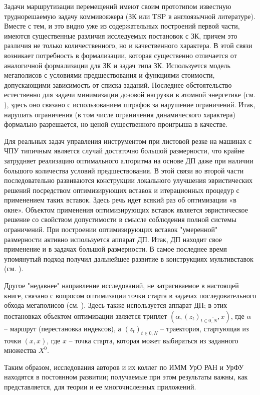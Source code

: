 \documentclass[12pt,twoside]{report}
\begin{document}
{{Задачи маршрутизации перемещений имеют своим прототипом известную труднорешаемую задачу коммивояжера (ЗК или TSP в англоязычной литературе). Вместе с тем, и это видно уже из содержательных построений первой части, имеются существенные различия исследуемых постановок с ЗК, причем это различия не только количественного, но и качественного характера. В этой связи возникает потребность в формализации, которая существенно отличается от аналогичной формализации для ЗК и задач типа ЗК. Используется модель мегаполисов с условиями предшествования и функциями стоимости, допускающими зависимость от списка заданий. Последнее обстоятельство естественно для задачи минимизации дозовой нагрузки в атомной энергетике (см. \cite{Cha2`}), здесь оно связано с использованием штрафов за нарушение ограничений. Итак, нарушать ограничения (в том числе ограничения динамического характера) формально разрешается, но ценой существенного проигрыша в качестве.

Для реальных задач управления инструментом при листовой резке на машинах с ЧПУ типичным является случай достаточно большой размерности, что крайне затрудняет реализацию оптимального алгоритма на основе ДП даже при наличии большого количества условий предшествования. В этой связи во второй части последовательно развиваются конструкции локального улучшения эвристических решений посредством оптимизирующих вставок и итерационных процедур с применением таких вставок. Здесь речь идет всякий раз об оптимизации «в окне». Объектом применения оптимизирующих вставок является эвристическое решение со свойством допустимости в смысле соблюдения полной системы ограничений. При построении оптимизирующих вставок "умеренной"\; размерности активно используется аппарат ДП. Итак, ДП находит свое применение и в задачах большой размерности. В самое последнее время упомянутый подход получил дальнейшее развитие в конструкциях мультивставок (см. \cite{ChenGrig, ChenChenGrig}).

Другое "недавнее"\; направление исследований, не затрагиваемое в настоящей книге, связано с вопросом оптимизации точки старта в задачах последовательного обхода мегаполисов (см. \cite{StartPoint,StartFinishPoint,ChenChen}). Здесь также используется аппарат ДП; в этих постановках объектом оптимизации звляется триплет $(\alpha,(z_t)_{t\in \overline{0,N}},x)$, где $\alpha$ -- маршрут (перестановка индексов), а $(z_t)_{t\in \overline{0,N}}$ -- траектория, стартующая из точки $(x,x)$, где $x$ -- точка старта, которая может выбираться из заданного множества $X^0$.

Таким образом, исследования авторов и их коллег по ИММ УрО РАН и УрФУ находятся в постоянном развитии; получаемые при этом результаты важны, как представляется, для теории и ее многочисленных приложений.











}}
\end{document}
